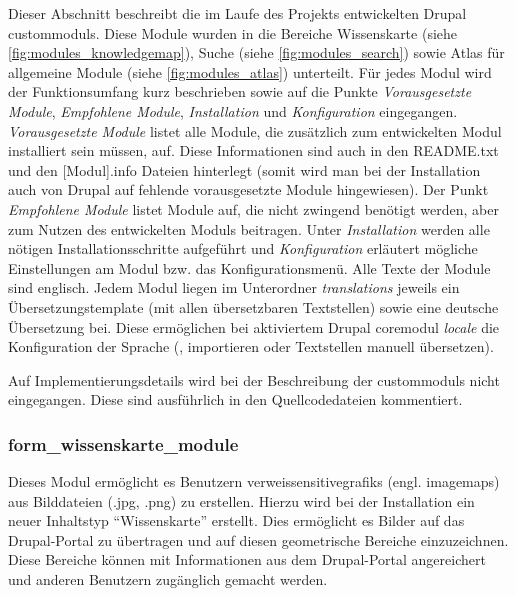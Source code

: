 Dieser Abschnitt beschreibt die im Laufe des Projekts entwickelten Drupal \glspl{custommodul}. Diese Module wurden in die Bereiche Wissenskarte (siehe \cref{fig:modules_knowledgemap}), Suche (siehe \cref{fig:modules_search}) sowie Atlas für allgemeine Module (siehe \cref{fig:modules_atlas}) unterteilt.
Für jedes Modul wird der Funktionsumfang kurz beschrieben sowie auf die Punkte \textit{Vorausgesetzte Module}, \textit{Empfohlene Module}, \textit{Installation} und \textit{Konfiguration} eingegangen. \textit{Vorausgesetzte Module} listet alle Module, die zusätzlich zum entwickelten Modul installiert sein müssen, auf. Diese Informationen sind auch in den README.txt und den [Modul].info Dateien hinterlegt (somit wird man bei der Installation auch von Drupal auf fehlende vorausgesetzte Module hingewiesen). Der Punkt \textit{Empfohlene Module} listet Module auf, die nicht zwingend benötigt werden, aber zum Nutzen des entwickelten Moduls beitragen. Unter \textit{Installation} werden alle nötigen Installationsschritte aufgeführt und \textit{Konfiguration} erläutert mögliche Einstellungen am Modul bzw. das Konfigurationsmenü. Alle Texte der Module sind englisch. Jedem Modul liegen im Unterordner \textit{translations} jeweils ein Übersetzungstemplate (mit allen übersetzbaren Textstellen) sowie eine deutsche Übersetzung bei. Diese ermöglichen bei aktiviertem Drupal \gls{coremodul} \textit{locale} die Konfiguration der Sprache (, importieren oder Textstellen manuell übersetzen).

Auf Implementierungsdetails wird bei der Beschreibung der \glspl{custommodul} nicht eingegangen. Diese sind ausführlich in den Quellcodedateien kommentiert.




\subsubsection{form\_wissenskarte\_module}\label{subsub:form_wissenskarte_module}
Dieses Modul ermöglicht es Benutzern \glspl{verweissensitivegrafik} (engl. \glspl{imagemap}) aus Bilddateien (.jpg, .png) zu erstellen. Hierzu wird bei der Installation ein neuer Inhaltstyp \enquote{Wissenskarte} erstellt. Dies ermöglicht es Bilder auf das Drupal-Portal zu übertragen und auf diesen geometrische Bereiche einzuzeichnen. Diese Bereiche können mit Informationen aus dem Drupal-Portal angereichert und anderen Benutzern zugänglich gemacht werden.

